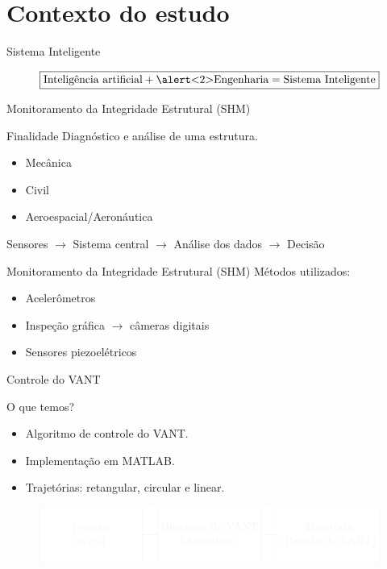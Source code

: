 \section{Contexto do estudo}

\begin{frame}{Sistema Inteligente}

\[\boxed{\text{Inteligência artificial} + \text{\alert<2>{Engenharia}} = \text{Sistema Inteligente}}\] 
    
\end{frame}

\begin{frame}{Monitoramento da Integridade Estrutural (SHM)}

\begin{block}{Finalidade}
    Diagnóstico e análise de uma estrutura.
\end{block} \pause

\begin{itemize}
    \item Mecânica
    \item Civil
    \item Aeroespacial/Aeronáutica
\end{itemize} \pause
\vfill
Sensores \(\rightarrow\) Sistema central \(\rightarrow\) Análise dos dados \(\rightarrow\) Decisão
\end{frame}

\begin{frame}{Monitoramento da Integridade Estrutural (SHM)}
Métodos utilizados:

\begin{itemize}
    \item Acelerômetros
    \item Inspeção gráfica \(\rightarrow\) câmeras digitais
    \item \alert<2>{Sensores piezoelétricos}
\end{itemize}

\end{frame}

\begin{frame}{Controle do VANT}
\pause

\begin{block}{O que temos?}
    \begin{itemize}
        \item Algoritmo de controle do VANT.
        \item Implementação em MATLAB.
        \item Trajetórias: retangular, circular e linear.
    \end{itemize}
\end{block} \pause
\begin{figure}
    \centering
    \includegraphics{figures/dinamica_vant.pdf}
    \end{figure}
\end{frame}

